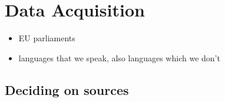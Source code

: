 \documentclass[
  12pt,
]{scrreprt}
\providecommand{\tightlist}{%
  \setlength{\itemsep}{0pt}\setlength{\parskip}{0pt}}
\begin{document}
\hypertarget{data-acquisition}{%
\chapter{Data Acquisition}\label{data-acquisition}}

\begin{itemize}
\tightlist
\item
  EU parliaments
\item
  languages that we speak, also languages which we don't
\end{itemize}

\hypertarget{deciding-on-sources}{%
\section{Deciding on sources}\label{deciding-on-sources}}
\end{document}
